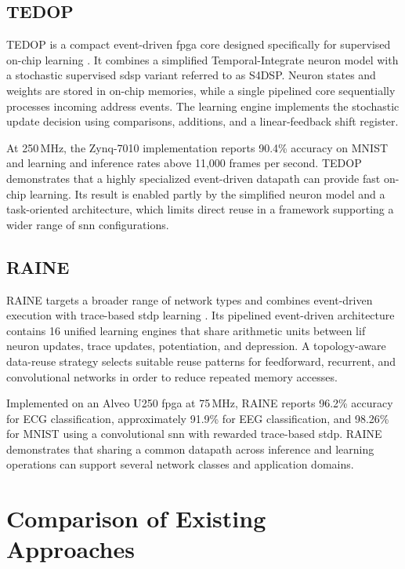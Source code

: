 \subsection{TEDOP}

TEDOP is a compact event-driven \gls{fpga} core designed specifically for supervised on-chip learning \cite{Shi2022TEDOP}. It combines a simplified Temporal-Integrate neuron model with a stochastic supervised \gls{sdsp} variant referred to as S4DSP. Neuron states and weights are stored in on-chip memories, while a single pipelined core sequentially processes incoming address events. The learning engine implements the stochastic update decision using comparisons, additions, and a linear-feedback shift register.

At 250\,MHz, the Zynq-7010 implementation reports 90.4\% accuracy on MNIST and learning and inference rates above 11,000 frames per second. TEDOP demonstrates that a highly specialized event-driven datapath can provide fast on-chip learning. Its result is enabled partly by the simplified neuron model and a task-oriented architecture, which limits direct reuse in a framework supporting a wider range of \gls{snn} configurations.

\subsection{RAINE}

RAINE targets a broader range of network types and combines event-driven execution with trace-based \gls{stdp} learning \cite{Fang2022RAINE}. Its pipelined event-driven architecture contains 16 unified learning engines that share arithmetic units between \gls{lif} neuron updates, trace updates, potentiation, and depression. A topology-aware data-reuse strategy selects suitable reuse patterns for feedforward, recurrent, and convolutional networks in order to reduce repeated memory accesses.

Implemented on an Alveo U250 \gls{fpga} at 75\,MHz, RAINE reports 96.2\% accuracy for ECG classification, approximately 91.9\% for EEG classification, and 98.26\% for MNIST using a convolutional \gls{snn} with rewarded trace-based \gls{stdp}. RAINE demonstrates that sharing a common datapath across inference and learning operations can support several network classes and application domains.

\section{Comparison of Existing Approaches}
\label{subsec: comparison of existing approaches}

